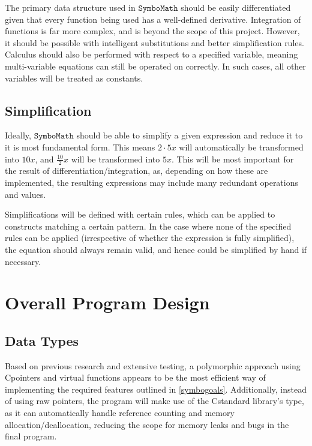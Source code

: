 \documentclass[12pt]{article}
\def\CC{{C\nolinebreak[4]\hspace{-.05em}\raisebox{.4ex}{\tiny\bf ++ }}}
\def\Symbo{{$\texttt{SymboMath}$}}
\begin{document}
The primary data structure used in \Symbo{} should be easily differentiated given that every function being used has a well-defined derivative. Integration of functions is far more complex, and is beyond the scope of this project. However, it should be possible with intelligent substitutions and better simplification rules. Calculus should also be performed with respect to a specified variable, meaning multi-variable equations can still be operated on correctly. In such cases, all other variables will be treated as constants.

\subsection{Simplification} \label{simplificationgoal}

Ideally, \Symbo{} should be able to simplify a given expression and reduce it to it is most fundamental form. This means $2 \cdot 5x$ will automatically be transformed into $10x$, and $\frac{10}{2}x$ will be transformed into $5x$. This will be most important for the result of differentiation/integration, as, depending on how these are implemented, the resulting expressions may include many redundant operations and values.

Simplifications will be defined with certain rules, which can be applied to constructs matching a certain pattern. In the case where none of the specified rules can be applied (irrespective of whether the expression is fully simplified), the equation should always remain valid, and hence could be simplified by hand if necessary.

\pagebreak

\section{Overall Program Design}

\subsection{Data Types} \label{datatypes}

Based on previous research and extensive testing, a polymorphic approach using \CC pointers and virtual functions appears to be the most efficient way of implementing the required features outlined in \ref{symbogoals}. Additionally, instead of using raw pointers, the program will make use of the \CC standard library's  type, as it can automatically handle reference counting and memory allocation/deallocation, reducing the scope for memory leaks and bugs in the final program.
\end{document}
